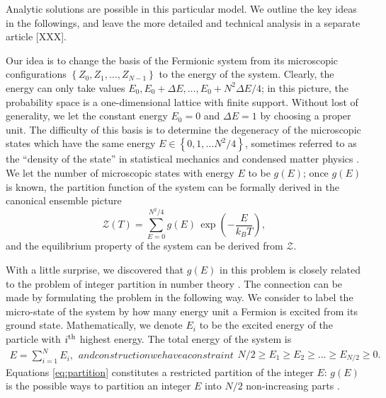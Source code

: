 \documentclass[twocolumn,showpacs,preprintnumbers,amsmath,amssymb,pre]{revtex4-1}
\renewcommand{\l}{\left}
\renewcommand{\r}{\right}
\newcommand{\eq}[2]{\begin{equation}#1\label{#2}\end{equation}}
\begin{document}
Analytic solutions are possible in this particular model. We outline the key ideas in the followings, and leave the more detailed and technical analysis in a separate article [XXX]. 

Our idea is to change the basis of the Fermionic system from its microscopic configurations $\l\{Z_0,Z_1,\ldots,Z_{N-1}\r\}$ to the energy of the system. Clearly, the energy can only take values $E_0, E_0+\Delta E, \ldots, E_0 + N^2 \Delta E / 4$; in this picture, the probability space is a one-dimensional lattice with finite support. Without lost of generality, we let the constant energy $E_0=0$ and $\Delta E=1$ by choosing a proper unit. The difficulty of this basis is to determine the degeneracy of the microscopic states which have the same energy $E \in \l\{0,1,\ldots N^2/4\r\}$, sometimes referred to as the ``density of the state'' in statistical mechanics \cite{huang1987statistical} and condensed matter physics \cite{sander2009advanced}. We let the number of microscopic states with energy $E$ to be $g(E)$; once $g(E)$ is known, the partition function of the system can be formally derived in the canonical ensemble picture
\eq{
\mathcal{Z}\l(T\r) = \sum_{E=0}^{N^2/4} g(E) \, \exp \l(-\frac{E}{k_B T}\r),
}{eq:par_func}
and the equilibrium property of the system can be derived from $\mathcal{Z}$. 

With a little surprise, we discovered that $g(E)$ in this problem is closely related to the problem of integer partition in number theory \cite{andrews1998theory}. The connection can be made by formulating the problem in the following way. We consider to label the micro-state of the system by how many energy unit a Fermion is excited from its ground state. Mathematically, we denote $E_i$ to be the excited energy of the particle with $i^{\rm th}$ highest energy. The total energy of the system is
\begin{subequations} \label{eq:partition}
\begin{align}
E= \sum_{i=1}^{N} E_i,
\end{align}
and construction we have a constraint 
\begin{align}
N/2 \ge E_1 \ge E_2 \ge \ldots \ge E_{N/2} \ge 0. \label{eq:partition_constraint}
\end{align}
\end{subequations}
Equations \eqref{eq:partition} constitutes a restricted partition of the integer $E$: $g(E)$ is the possible ways to partition an integer $E$ into $N/2$ non-increasing parts \cite{andrews1998theory}.
\end{document}
